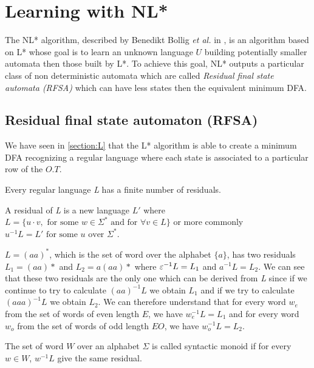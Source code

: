 \section{Learning with NL* }

The NL* algorithm, described by Benedikt Bollig \textit{et al.} in \cite{NLPaper}, is an algorithm based on L* whose goal is to learn an unknown language $U$ building potentially smaller automata then those built by L*. To achieve this goal, NL* outputs a particular class of non deterministic automata which are called \textit{Residual final state automata (RFSA)} which can have less states then the equivalent minimum DFA.

\subsection{Residual final state automaton (RFSA)}
\label{sec:RFSA}

We have seen in \cref{section:L} that the L* algorithm is able to create a minimum DFA recognizing a regular language where each state is associated to a particular row of the $O.T$.

\begin{theorem}
  Every regular language \textit{L} has a finite number of residuals.
\end{theorem}

A residual of \textit{L} is a new language $L'$ where $L = \{u \cdot v, \text{ for some } w \in \Sigma^* \text{ and for } \forall v \in L\}$ or more commonly $u^{-1} L = L' \text{ for some } u \text{ over } \Sigma^*$.

\begin{example}
  \label{example:residual}
  $L = (aa)^*$, which is the set of word over the alphabet $\{a\}$, has two residuals $L_1 = (aa)*$ and $L_2 = a(aa)*$ where ${\varepsilon}^{-1} L = L_1$ and $a^{-1}L = L_2$. We can see that these two residuals are the only one which can be derived from \textit{L} since if we continue to try to calculate $(aa)^{-1}L$ we obtain $L_1$ and if we try to calculate $(aaa)^{-1}L$ we obtain $L_2$. We can therefore understand that for every word $w_e$ from the set of words of even length $E$, we have $w_e^{-1}L = L_1$ and for every word $w_o$ from the set of words of odd length $EO$, we have $w_o^{-1}L = L_2$.
\end{example}

\begin{definition}
  \label{def:monoid}
  The set of word $W$ over an alphabet $\Sigma$ is called syntactic monoid if for every $w \in W$, $w^{-1}L$ give the same residual.
\end{definition}

